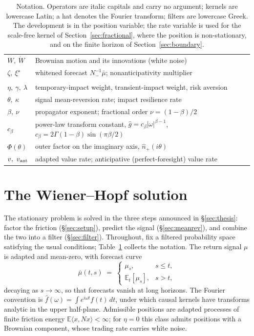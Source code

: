 \documentclass[11pt]{article}
\newcommand{\E}{\mathbb{E}}
\theoremstyle{plain}
\theoremstyle{definition}
\theoremstyle{remark}
\begin{document}
\begin{table}[t]
\begin{tabularx}{\textwidth}{@{}lX@{}}
$W,\ \dot W$ & Brownian motion and its innovations (white noise) \\
$\zeta,\ \xi^\star$ & whitened forecast $N_-^{-1}\bar\mu$; nonanticipativity multiplier \\
\addlinespace
\multicolumn{2}{@{}l}{\emph{Scalars}}\\
$\eta,\ \gamma,\ \lambda$ & temporary-impact weight, transient-impact weight, risk aversion \\
$\theta,\ \kappa$ & signal mean-reversion rate; impact resilience rate \\
$\beta,\ \nu$ & propagator exponent; fractional order $\nu=(1-\beta)/2$ \\
$c_\beta$ & power-law transform constant, $\hat g=c_\beta|\omega|^{\beta-1}$, $c_\beta=2\Gamma(1-\beta)\sin(\pi\beta/2)$ \\
$\Phi(\theta)$ & outer factor on the imaginary axis, $\hat n_+(i\theta)$ \\
$v,\ v_{\rm ant}$ & adapted value rate; anticipative (perfect-foresight) value rate \\
\bottomrule
\end{tabularx}
\caption{Notation. Operators are italic capitals and carry no argument; kernels are lowercase Latin; a hat denotes the Fourier transform; filters are lowercase Greek. The development is in the position variable; the rate variable is used for the scale-free kernel of Section~\ref{sec:fractional}, where the position is non-stationary, and on the finite horizon of Section~\ref{sec:boundary}.}
\label{tab:notation}
\end{table}

\section{The Wiener--Hopf solution}\label{sec:interior}

The stationary problem is solved in the three steps announced in \S\ref{sec:thesis}: factor the friction (\S\ref{sec:setup}), predict the signal (\S\ref{sec:meanrev}), and combine the two into a filter (\S\ref{sec:filter}). Throughout, fix a filtered probability space satisfying the usual conditions; Table~\ref{tab:notation} collects the notation. The return signal $\mu$ is adapted and mean-zero, with forecast curve
\[
\bar\mu(t,s) \;=\; \begin{cases}\mu_s, & s\le t,\\[2pt] \E_t[\mu_s], & s>t,\end{cases}
\]
decaying as $s\to\infty$, so that forecasts vanish at long horizons. The Fourier convention is $\hat f(\omega)=\int e^{i\omega t}f(t)\,dt$, under which causal kernels have transforms analytic in the upper half-plane. Admissible positions are adapted processes of finite friction energy $\E\langle x,Nx\rangle<\infty$; for $\eta=0$ this class admits positions with a Brownian component, whose trading rate carries white noise.
\end{document}
